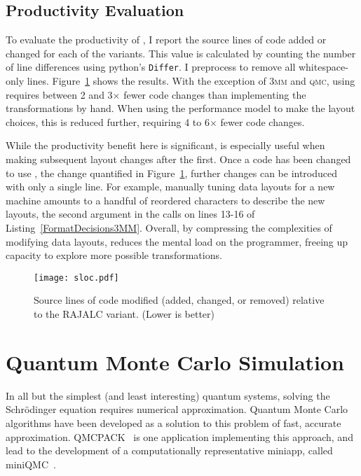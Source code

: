 \subsection{Productivity Evaluation}

To evaluate the productivity of \FormatDecisions{}, I report the source lines of code added or changed for each of the variants.
This value is calculated by counting the number of line differences using python's \verb.Differ.. 
I preprocess to remove all whitespace-only lines.
Figure~\ref{PolybenchSLOC} shows the results.
With the exception of \textsc{3mm} and \textsc{qmc}, using \FormatDecisions{} requires between 2 and 3$\times$ fewer code changes than implementing the transformations by hand. 
When using the performance model to make the layout choices, this is reduced further, requiring 4 to 6$\times$ fewer code changes. 

While the productivity benefit here is significant, \FormatDecisions{} is especially useful when making subsequent layout changes after the first. 
Once a code has been changed to use \FormatDecisions{}, the change quantified in Figure~\ref{PolybenchSLOC}, further changes can be introduced with only a single line. 
For example, manually tuning data layouts for a new machine amounts to a handful of reordered characters to describe the new layouts, the second argument in the calls on lines 13-16 of Listing~\ref{FormatDecisions3MM}. 
Overall, by compressing the complexities of modifying data layouts, \FormatDecisions{} reduces the mental load on the programmer, freeing up capacity to explore more possible transformations.

\begin{figure}
	\texttt{[image: sloc.pdf]}
	\caption{Source lines of code modified (added, changed, or removed) relative to the  RAJALC variant. (Lower is better)}\label{PolybenchSLOC}  
\end{figure}

\section{Quantum Monte Carlo Simulation}\label{sec:miniQMC}
In all but the simplest (and least interesting) quantum systems, solving the Schr\"odinger equation requires numerical approximation. 
Quantum Monte Carlo algorithms have been developed as a solution to this problem of fast, accurate approximation.
QMCPACK~\cite{kim2018qmcpack} is one application implementing this approach, and lead to the development of a computationally representative miniapp, called miniQMC~\cite{richards2018fy18}.

